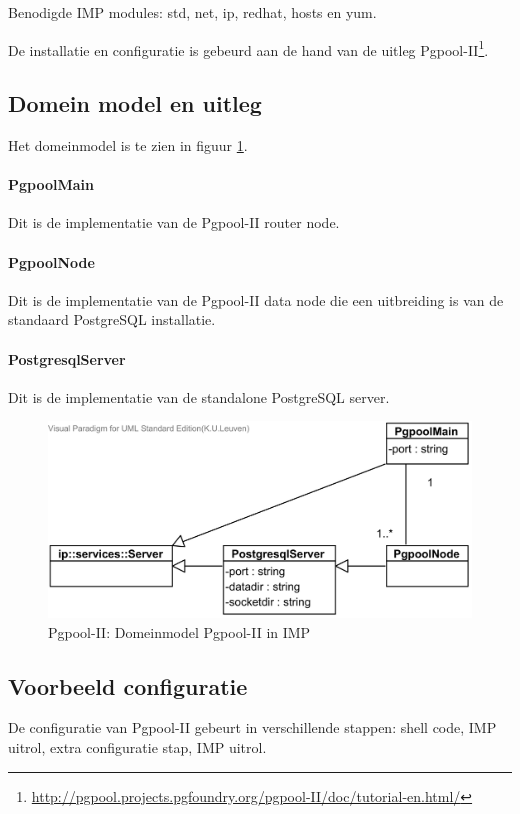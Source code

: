 Benodigde IMP modules: std, net, ip, redhat, hosts en yum. 

De installatie en configuratie is gebeurd aan de hand van de uitleg Pgpool-II\footnote{\url {http://pgpool.projects.pgfoundry.org/pgpool-II/doc/tutorial-en.html/}}. 

\subsection{Domein model en uitleg}
Het domeinmodel is te zien in figuur \ref{fig:imp-pgpool-domeinmodel}.

	\paragraph{PgpoolMain} Dit is de implementatie van de Pgpool-II router node. 
	
	\paragraph{PgpoolNode} Dit is de implementatie van de Pgpool-II data node die een uitbreiding is van de standaard PostgreSQL installatie. 
		
	\paragraph{PostgresqlServer} Dit is de implementatie van de standalone PostgreSQL server. 

\begin{figure}[ht!]
\centering
\includegraphics[width=\linewidth]{img/Postgres-Domeinmodel.png}
\caption{Pgpool-II: Domeinmodel Pgpool-II in IMP}
\label{fig:imp-pgpool-domeinmodel}
\end{figure}

\subsection{Voorbeeld configuratie}
De configuratie van Pgpool-II gebeurt in verschillende stappen: shell code, IMP uitrol, extra configuratie stap, IMP uitrol. 

